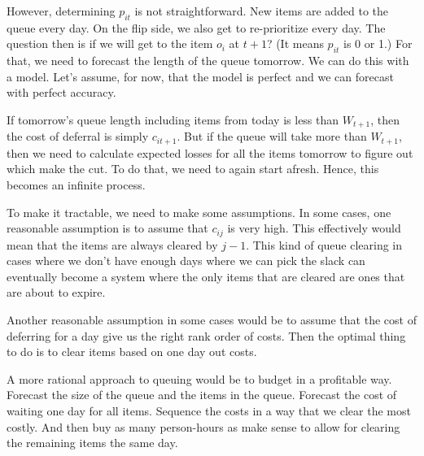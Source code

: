 \documentclass[12pt, letterpaper]{article}
\begin{document}
However, determining $p_{it}$ is not straightforward. New items are added to the queue every day. On the flip side, we also get to re-prioritize every day. The question then is if we will get to the item $o_i$ at $t+1$? (It means $p_{it}$ is 0 or 1.) For that, we need to forecast the length of the queue tomorrow. We can do this with a model. Let's assume, for now, that the model is perfect and we can forecast with perfect accuracy. 

If tomorrow's queue length including items from today is less than $W_{t+1}$, then the cost of deferral is simply $c_{it+1}$. But if the queue will take more than $W_{t+1}$, then we need to calculate expected losses for all the items tomorrow to figure out which make the cut. To do that, we need to again start afresh. Hence, this becomes an infinite process.

To make it tractable, we need to make some assumptions. In some cases, one reasonable assumption is to assume that $c_{ij}$ is very high. This effectively would mean that the items are always cleared by $j-1$. This kind of queue clearing in cases where we don't have enough days where we can pick the slack can eventually become a system where the only items that are cleared are ones that are about to expire. 

Another reasonable assumption in some cases would be to assume that the cost of deferring for a day give us the right rank order of costs. Then the optimal thing to do is to clear items based on one day out costs.

A more rational approach to queuing would be to budget in a profitable way. Forecast the size of the queue and the items in the queue. Forecast the cost of waiting one day for all items. Sequence the costs in a way that we clear the most costly. And then buy as many person-hours as make sense to allow for clearing the remaining items the same day.
\end{document}

